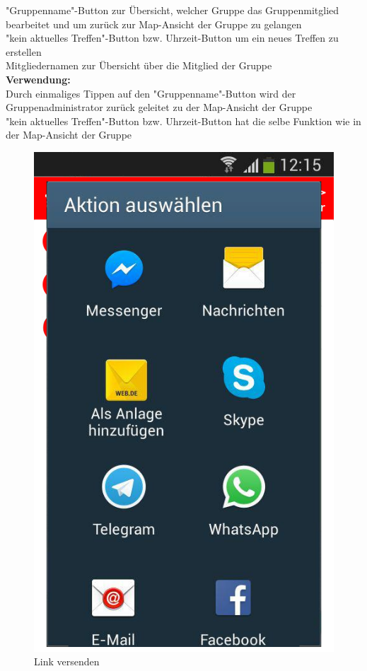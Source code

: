 "Gruppenname"-Button zur Übersicht, welcher Gruppe das Gruppenmitglied  bearbeitet und um zurück zur Map-Ansicht der Gruppe zu gelangen\\
"kein aktuelles Treffen"-Button bzw. Uhrzeit-Button um ein neues Treffen zu erstellen\\
Mitgliedernamen zur Übersicht über die Mitglied der Gruppe\\
\textbf{Verwendung:}\\
Durch einmaliges Tippen auf den "Gruppenname"-Button wird der Gruppenadministrator zurück geleitet zu der Map-Ansicht der Gruppe\\
"kein aktuelles Treffen"-Button bzw. Uhrzeit-Button hat die selbe Funktion wie in der Map-Ansicht der Gruppe\\

\begin{figure} [H]
	\caption{Link versenden}
\begin{center}
	\includegraphics[scale =0.5]{resources/images/link_versenden.png}
\end{center}
\end{figure}
